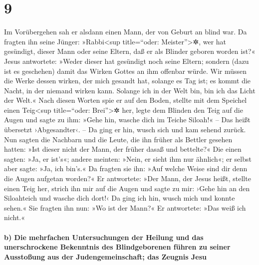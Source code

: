 \hypertarget{section-8}{%
\section{9}\label{section-8}}

 Im Vorübergehen sah er alsdann einen Mann, der von Geburt
an blind war.  Da fragten ihn seine Jünger:
»Rabbi\textless sup title=``oder: Meister''\textgreater✲, wer hat
gesündigt, dieser Mann oder seine Eltern, daß er als Blinder geboren
worden ist?«  Jesus antwortete: »Weder dieser hat
gesündigt noch seine Eltern; sondern (dazu ist es geschehen) damit das
Wirken Gottes an ihm offenbar würde.  Wir müssen die Werke
dessen wirken, der mich gesandt hat, solange es Tag ist; es kommt die
Nacht, in der niemand wirken kann.  Solange ich in der
Welt bin, bin ich das Licht der Welt.«  Nach diesen Worten
spie er auf den Boden, stellte mit dem Speichel einen Teig\textless sup
title=``oder: Brei''\textgreater✲ her, legte dem Blinden den Teig auf
die Augen  und sagte zu ihm: »Gehe hin, wasche dich im
Teiche Siloah!« -- Das heißt übersetzt ›Abgesandter‹. -- Da ging er hin,
wusch sich und kam sehend zurück.  Nun sagten die Nachbarn
und die Leute, die ihn früher als Bettler gesehen hatten: »Ist dieser
nicht der Mann, der früher dasaß und bettelte?«  Die einen
sagten: »Ja, er ist's«; andere meinten: »Nein, er sieht ihm nur
ähnlich«; er selbst aber sagte: »Ja, ich bin's.«  Da
fragten sie ihn: »Auf welche Weise sind dir denn die Augen aufgetan
worden?«  Er antwortete: »Der Mann, der Jesus heißt,
stellte einen Teig her, strich ihn mir auf die Augen und sagte zu mir:
›Gehe hin an den Siloahteich und wasche dich dort!‹ Da ging ich hin,
wusch mich und konnte sehen.«  Sie fragten ihn nun: »Wo
ist der Mann?« Er antwortete: »Das weiß ich nicht.«

\hypertarget{b-die-mehrfachen-untersuchungen-der-heilung-und-das-unerschrockene-bekenntnis-des-blindgeborenen-fuxfchren-zu-seiner-ausstouxdfung-aus-der-judengemeinschaft-das-zeugnis-jesu}{%
\paragraph{b) Die mehrfachen Untersuchungen der Heilung und das
unerschrockene Bekenntnis des Blindgeborenen führen zu seiner Ausstoßung
aus der Judengemeinschaft; das Zeugnis
Jesu}\label{b-die-mehrfachen-untersuchungen-der-heilung-und-das-unerschrockene-bekenntnis-des-blindgeborenen-fuxfchren-zu-seiner-ausstouxdfung-aus-der-judengemeinschaft-das-zeugnis-jesu}}

